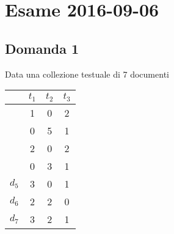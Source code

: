 
\section{Esame 2016-09-06}

\subsection{Domanda 1}

Data una collezione testuale di 7 documenti

\begin{table}[htbp]
	\centering
	
	\begin{tabular}{c|c|c|c|}
		\cline{2-4}
		& \textbf{$t_1$}                                 & \textbf{$t_2$}                                 & \textbf{$t_3$}                                 \\ \hline
		\rowcolor[HTML]{EFEFEF} 
		\multicolumn{1}{|c|}{\cellcolor[HTML]{EFEFEF}{\color[HTML]{32CB00} $d_1$}} & {\color[HTML]{32CB00} 1}                      & {\color[HTML]{32CB00} 0}                      & {\color[HTML]{32CB00} 2}                      \\ \hline
		\rowcolor[HTML]{EFEFEF} 
		\multicolumn{1}{|c|}{\cellcolor[HTML]{EFEFEF}$d_2$}                        & 0                                             & 5                                             & 1                                             \\ \hline
		\rowcolor[HTML]{EFEFEF} 
		\multicolumn{1}{|c|}{\cellcolor[HTML]{EFEFEF}{\color[HTML]{32CB00} $d_3$}} & {\color[HTML]{32CB00} 2}                      & {\color[HTML]{32CB00} 0}                      & {\color[HTML]{32CB00} 2}                      \\ \hline
		\rowcolor[HTML]{EFEFEF} 
		\multicolumn{1}{|c|}{\cellcolor[HTML]{EFEFEF}$d_4$}                        & 0                                             & 3                                             & 1                                             \\ \hline
		\multicolumn{1}{|c|}{$d_5$}                                                & 3                                             & 0                                             & 1                                             \\ \hline
		\multicolumn{1}{|c|}{$d_6$}                                                & 2                                             & 2                                             & 0                                             \\ \hline
		\multicolumn{1}{|c|}{{\color[HTML]{32CB00} $d_7$}}                         & {\color[HTML]{32CB00} 3} & {\color[HTML]{32CB00} 2} & {\color[HTML]{32CB00} 1} \\ \hline
	\end{tabular}
\end{table}

